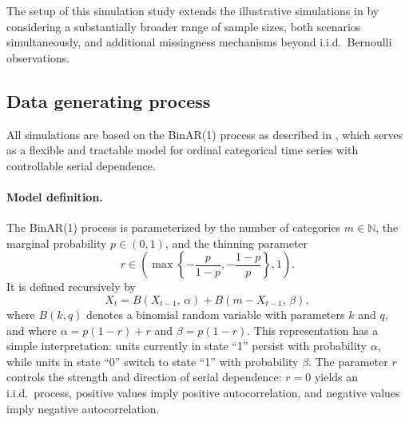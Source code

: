 ﻿\documentclass[12pt,a4paper]{scrreprt}
\theoremstyle{definition}
\begin{document}
The setup of this simulation study extends the illustrative simulations in \citet{weiss2021categorical} by considering a substantially 
broader range of sample sizes, both scenarios simultaneously, and additional missingness mechanisms beyond i.i.d.\ Bernoulli observations.
\subsection*{Data generating process}

All simulations are based on the BinAR(1) process as described in 
\citet[Section~3.3]{Weiss2018}, which serves as a flexible and tractable 
model for ordinal categorical time series with controllable serial dependence.

\paragraph{Model definition.}
The BinAR(1) process is parameterized by the number of categories 
$m \in \mathbb{N}$, the marginal probability $p \in (0,1)$, and the 
thinning parameter 
\[
r \in \left(\max\left\{-\frac{p}{1-p}, -\frac{1-p}{p}\right\}, 1\right).
\]
It is defined recursively by
\[
X_t = B(X_{t-1},\, \alpha) + B(m - X_{t-1},\, \beta),
\]
where $B(k, q)$ denotes a binomial random variable with parameters 
$k$ and $q$, and where $\alpha = p(1-r) + r$ and $\beta = p(1-r)$. 
This representation has a simple interpretation: units currently in state 
“1” persist with probability $\alpha$, while units in state “0” switch to 
state “1” with probability $\beta$. The parameter $r$ controls the strength and direction of serial 
dependence: $r = 0$ yields an i.i.d.\ process, positive values imply 
positive autocorrelation, and negative values imply negative autocorrelation.
\end{document}

